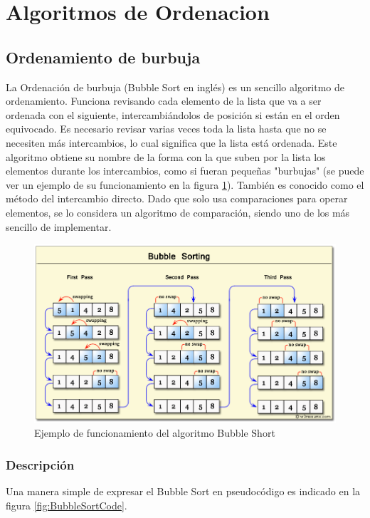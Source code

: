 \documentclass[8pt, A4]{article}    %
\begin{document}
\newpage

\section{Algoritmos de Ordenacion}

\subsection{Ordenamiento de burbuja}
La Ordenación de burbuja (Bubble Sort en inglés) es un sencillo algoritmo de ordenamiento. Funciona revisando cada elemento de la lista que va a ser ordenada con el siguiente, intercambiándolos de posición si están en el orden equivocado. Es necesario revisar varias veces toda la lista hasta que no se necesiten más intercambios, lo cual significa que la lista está ordenada. Este algoritmo obtiene su nombre de la forma con la que suben por la lista los elementos durante los intercambios, como si fueran pequeñas "burbujas" (se puede ver un ejemplo de su funcionamiento en la figura \ref{fig:BubbleSortInfo}). También es conocido como el método del intercambio directo. Dado que solo usa comparaciones para operar elementos, se lo considera un algoritmo de comparación, siendo uno de los más sencillo de implementar.

\begin{figure}[h]
\begin{center}
\includegraphics[width=1\textwidth]{graph/bubble-short-info}
\end{center}
\caption{Ejemplo de funcionamiento del algoritmo Bubble Short}
\label{fig:BubbleSortInfo}
\end{figure}

\subsubsection{Descripción}
Una manera simple de expresar el Bubble Sort en pseudocódigo es indicado en la figura \ref{fig:BubbleSortCode}.
\end{document}
